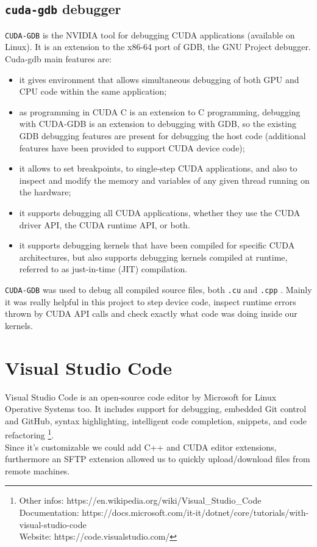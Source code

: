	\subsection{\texttt{cuda-gdb} debugger}
	\texttt{CUDA-GDB} is the NVIDIA tool for debugging CUDA applications (available on Linux). It is an extension to the x86-64 port of GDB, the GNU Project debugger.\\
	Cuda-gdb main features are:
	\begin{itemize}
		\item it gives environment that allows simultaneous debugging of both GPU and CPU code within the same application;
		
		\item as programming in CUDA C is an extension to C programming, debugging with CUDA-GDB is an extension to debugging with GDB, so the existing GDB debugging features are present for debugging the host code (additional features have been provided to support  CUDA device code);	
		
		\item it allows to set breakpoints, to single-step CUDA applications, and also to inspect and modify the memory and variables of any given thread running on the hardware;
		
		\item it supports debugging all CUDA applications, whether they use the CUDA driver API, the CUDA runtime API, or both.
		
		\item it supports debugging kernels that have been compiled for specific CUDA architectures, but also supports debugging kernels compiled at runtime, referred to as just-in-time (JIT) compilation.
	\end{itemize}	
	\texttt{CUDA-GDB} was used to debug all compiled source files, both \texttt{.cu} and \texttt{.cpp} .
	Mainly it was really helpful in this project to step device code, inspect runtime errors thrown by CUDA API calls and check exactly what code was doing inside our kernels.
	
\section{Visual Studio Code}
	Visual Studio Code is an open-source code editor by Microsoft for Linux Operative Systems too. It includes support for debugging, embedded Git control and GitHub, syntax highlighting, intelligent code completion, snippets, and code refactoring \footnote{Other infos: https://en.wikipedia.org/wiki/Visual\_Studio\_Code \\
		Documentation: https://docs.microsoft.com/it-it/dotnet/core/tutorials/with-visual-studio-code \\ 
		Website: https://code.visualstudio.com/}.\\
	Since it's customizable we could add C++ and CUDA editor extensions, furthermore an SFTP extension allowed us to quickly upload/download files from remote machines. 	
	
